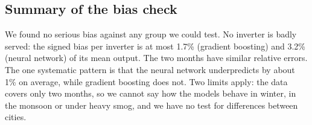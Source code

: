\subsection{Summary of the bias check}
We found no serious bias against any group we could test. No inverter is badly served: the signed bias per inverter is at most 1.7\% (gradient boosting) and 3.2\% (neural network) of its mean output. The two months have similar relative errors. The one systematic pattern is that the neural network underpredicts by about 1\% on average, while gradient boosting does not. Two limits apply: the data covers only two months, so we cannot say how the models behave in winter, in the monsoon or under heavy smog, and we have no test for differences between cities.